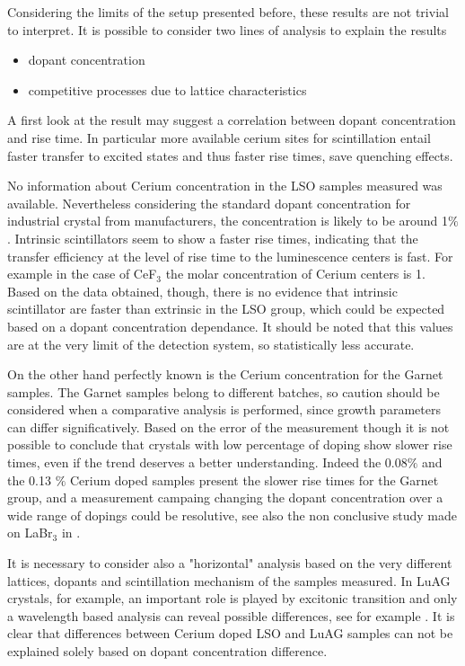 Considering the limits of the setup presented before, these results are not trivial to interpret.
It is possible to consider two lines of analysis to explain the results 
\begin{itemize}
\item dopant concentration
\item competitive processes due to lattice characteristics
\end{itemize}
A first look at the result may suggest a correlation between dopant concentration and rise time. In particular more available cerium sites for scintillation entail faster transfer to excited states and thus faster rise times, save quenching effects.

No information about Cerium concentration in the LSO samples measured was available. Nevertheless considering the standard dopant concentration for industrial crystal from manufacturers, the concentration is likely to be around 1$\%$. 
Intrinsic scintillators seem to show a faster rise times, indicating that the transfer efficiency at the level of rise time to the luminescence centers is fast. For example in the case of CeF$_{3}$ the molar concentration of Cerium centers is 1. Based on the data obtained, though, there is no evidence that intrinsic scintillator are faster than extrinsic in the LSO group, which could be expected based on a dopant concentration dependance. It should be noted that this values are at the very limit of the detection system, so statistically less accurate.

On the other hand perfectly known is the Cerium concentration for the Garnet samples. 
The Garnet samples belong to different batches, so caution should be considered when a comparative analysis is performed, since growth parameters can differ significatively. Based on the error of the measurement though it is not possible to conclude that crystals with low percentage of doping show slower rise times, even if the trend deserves a better understanding. Indeed the 0.08$\%$ and the 0.13 $\%$ Cerium doped samples present the slower rise times for the Garnet group, and a measurement campaing changing the dopant concentration over a wide range of dopings could be resolutive, see also the non conclusive study made on LaBr$_{3}$ in \cite{Moses2004}.

It is necessary to consider also a "horizontal" analysis based on the very different lattices, dopants and scintillation mechanism of the samples measured. In LuAG crystals, for example, an important role is played by excitonic transition and only a wavelength based analysis can reveal possible differences, see for example \cite{Belsky2013}.
It is clear that differences between Cerium doped LSO and LuAG samples can not be explained solely based on dopant concentration difference.


